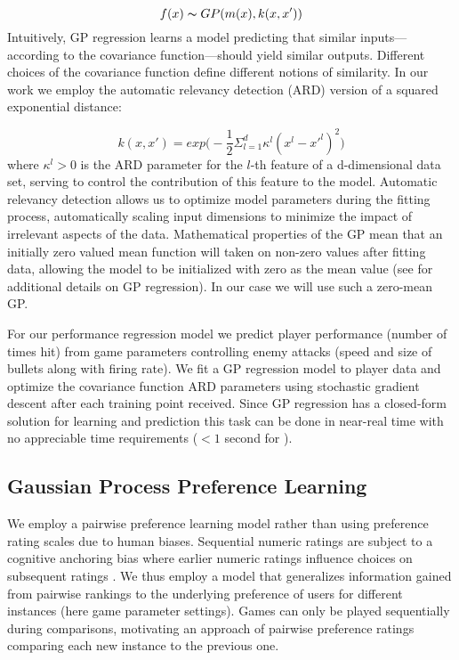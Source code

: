\documentclass[letterpaper]{article}
\begin{document}
$$ f(x) \thicksim GP( m(x), k(x,x') ) $$
Intuitively, GP regression learns a model predicting that similar inputs---according to the covariance function---should yield similar outputs. Different choices of the covariance function define different notions of similarity. In our work we employ the automatic relevancy detection (ARD) version of a squared exponential distance:

$$ k(x,x') = exp\big( -\frac{1}{2} \Sigma_{l=1}^{d} \kappa^{l} (x^{l} - x'^{l})^2 \big) $$
where $\kappa^{l} > 0$ is the ARD parameter for the $l$-th feature of a {d}-dimensional data set, serving to control the contribution of this feature to the model. Automatic relevancy detection allows us to optimize model parameters during the fitting process, automatically scaling input dimensions to minimize the impact of irrelevant aspects of the data. Mathematical properties of the GP mean that an initially zero valued mean function will taken on non-zero values after fitting data, allowing the model to be initialized with zero as the mean value (see \cite{rasmussen2006} for additional details on GP regression). In our case we will use such a zero-mean GP.

For our performance regression model we predict player performance (number of times hit) from game parameters controlling enemy attacks (speed and size of bullets along with firing rate). We fit a GP regression model to player data and optimize the covariance function ARD parameters using stochastic gradient descent after each training point received. Since GP regression has a closed-form solution for learning and prediction this task can be done in near-real time with no appreciable time requirements ($< 1$ second for ).

\subsection{Gaussian Process Preference Learning}
We employ a pairwise preference learning model rather than using preference rating scales due to human biases. Sequential numeric ratings are subject to a cognitive anchoring bias where earlier numeric ratings influence choices on subsequent ratings . We thus employ a model that generalizes information gained from pairwise rankings to the underlying preference of users for different instances (here game parameter settings). Games can only be played sequentially during comparisons, motivating an approach of pairwise preference ratings comparing each new instance to the previous one.
\end{document}
